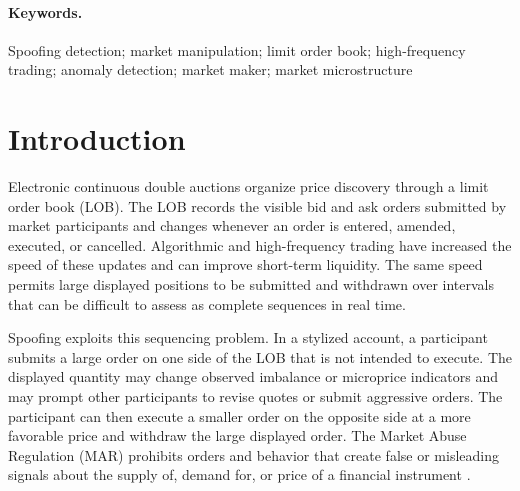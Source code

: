 \documentclass[11pt]{article}
\begin{document}
\begin{abstract}
alert records yields $34$ distinct subject--instrument intervals after overlapping or endpoint-sharing records are merged.
Every interval contains a recovered execution, $30$ contain an attributed withdrawal, and four contain a strict
sequence. The four strict overlaps occur only at firm scope, where the external firm maps to multiple canonical actors.
These findings support reproducible surveillance triage, but they do not constitute a statistical test, identify manipulative
intent, estimate causal effects, measure spoofing prevalence, or validate recall against independently adjudicated
manipulation labels. Legitimate liquidity provision remains an explicit alternative explanation.
\end{abstract}

\paragraph{Keywords.}
Spoofing detection; market manipulation; limit order book; high-frequency trading; anomaly detection; market maker; market microstructure

\section{Introduction}
\label{sec:introduction}
Electronic continuous double auctions organize price discovery through a limit order book (LOB). The LOB records the
visible bid and ask orders submitted by market participants and changes whenever an order is entered, amended, executed,
or cancelled. Algorithmic and high-frequency trading have increased the speed of these updates and can improve short-term
liquidity. The same speed permits large displayed positions to be submitted and withdrawn over intervals that can be
difficult to assess as complete sequences in real time.

Spoofing exploits this sequencing problem. In a stylized account, a participant submits a large order on one side of the
LOB that is not intended to execute. The displayed quantity may change observed imbalance or microprice indicators and may
prompt other participants to revise quotes or submit aggressive orders. The participant can then execute a smaller order on
the opposite side at a more favorable price and withdraw the large displayed order. The Market Abuse Regulation (MAR)
prohibits orders and behavior that create false or misleading signals about the supply of, demand for, or price of a
financial instrument \cite{EU5962014}.
\end{document}
